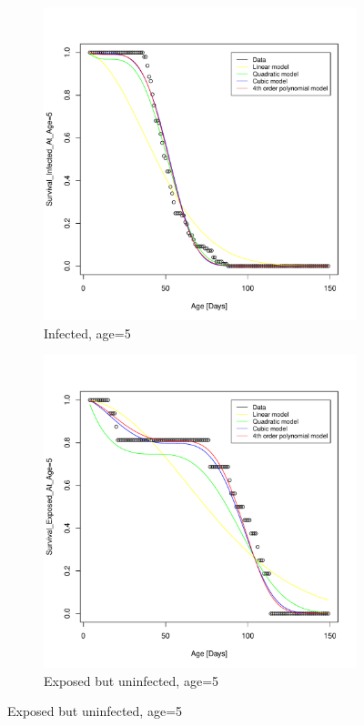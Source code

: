 \documentclass[10pt]{article}         %
\begin{document}
\begin{figure}[!h]
\begin{subfigure}[b]{0.6\textwidth}
    \includegraphics[width=\textwidth]{Fitting_delta_inf_at_age_5.pdf}
    \caption{Infected, age=5}
    \label{fig:subfigure_1}
  \end{subfigure}
  \begin{subfigure}[b]{0.6\textwidth}
    \includegraphics[width=\textwidth]{Fitting_delta_exp_at_age_5.pdf}
    \caption{Exposed but uninfected, age=5}
    \label{fig:subfigure_2}
  \end{subfigure}
\end{figure}
\end{document}
